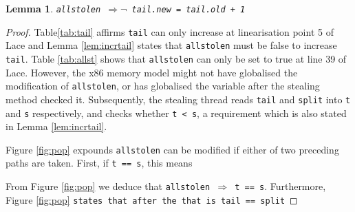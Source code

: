 \documentclass{sig-alternate-br}
\newtheorem{lemma}{Lemma}
\begin{document}
\begin{lemma}
	\texttt{allstolen $\Rightarrow \neg$ tail.new = tail.old + 1}
\end{lemma}
\begin{proof}
	Table\ref{tab:tail} affirms \texttt{tail} can only increase at linearisation point 5 of Lace and Lemma \ref{lem:incrtail} states that \texttt{allstolen} must be false to increase \texttt{tail}.
	Table \ref{tab:allst} shows that \texttt{allstolen} can only be set to true at line 39 of Lace.	
	However, the x86 memory model might not have globalised the modification of \texttt{allstolen}, or has globalised the variable after the stealing method checked it.
	Subsequently, the stealing thread reads \texttt{tail} and \texttt{split} into \texttt{t} and \texttt{s} respectively, and checks whether \texttt{t < s}, a requirement which is also stated in Lemma \ref{lem:incrtail}.
	
	Figure \ref{fig:pop} expounds \texttt{allstolen} can be modified if either of two preceding paths are taken.
	First, if \texttt{t == s}, this means 
	
	From Figure \ref{fig:pop} we deduce that \texttt{allstolen $\Rightarrow$ t == s}. Furthermore, Figure \ref{fig:pop} \texttt{states that after the  that is tail == split}
\end{proof}
\end{document}
